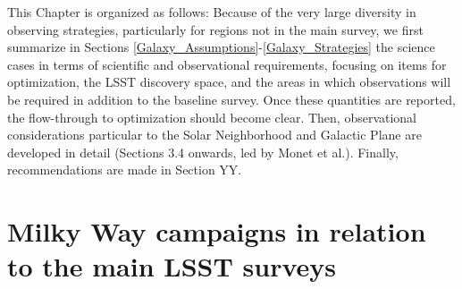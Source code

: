This Chapter is organized as follows: Because of the very large
diversity in observing strategies, particularly for regions not in the
main survey, we first summarize in Sections
\ref{Galaxy_Assumptions}-\ref{Galaxy_Strategies} the science cases in
terms of scientific and observational requirements, focusing on items
for optimization, the LSST discovery space, and the areas in which
observations will be required in addition to the baseline survey. Once
these quantities are reported, the flow-through to optimization should
become clear. Then, observational considerations particular to the
Solar Neighborhood and Galactic Plane are developed in detail
(Sections 3.4 onwards, led by Monet et al.). Finally, recommendations
are made in Section YY.

\navigationbar


\section{Milky Way campaigns in relation to the main LSST surveys}
\def\secname{assumptions}\label{sec:\secname}


